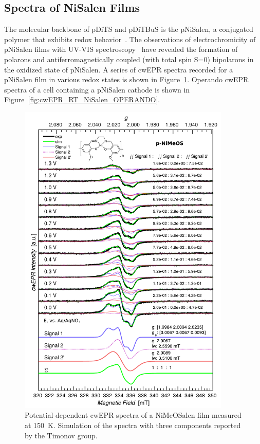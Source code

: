 \subsection{Spectra of NiSalen Films}
The molecular backbone of pDiTS and pDiTBuS is the pNiSalen, a conjugated polymer that exhibits redox behavior~\cite{Dmitrieva2018,Vereshchagin2020,Apraksin2021}. The observations of electrochromicity of pNiSalen films with UV-VIS spectroscopy~\cite{Dmitrieva2018} have revealed the formation of polarons and antiferromagnetically coupled (with total spin S=0) bipolarons in the oxidized state of pNiSalen. A series of cwEPR spectra recorded for a pNiSalen film in various redox states is shown in Figure~\ref{fig:cwEPR_CRYO_NiSalen_REDOX_SIM}. Operando cwEPR spectra of a cell containing a pNiSalen cathode is shown in Figure~\ref{fig:cwEPR_RT_NiSalen_OPERANDO}.

\begin{figure}[!h]
\center
	\includegraphics[width=0.9\textwidth]{./operando_epr/figures/CRYO/Figure_S8.pdf}
	\caption{Potential-dependent cwEPR spectra of a NiMeOSalen film measured at 150~K. Simulation of the spectra with three components reported by the Timonov group.}
	\label{fig:cwEPR_CRYO_NiSalen_REDOX_SIM}
\end{figure}

